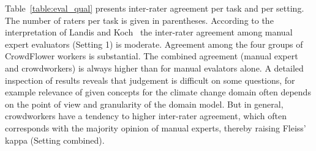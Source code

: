Table~\ref{table:eval_qual} presents inter-rater agreement per task and per setting. 
The number of raters per task is given in parentheses.
According to the interpretation of Landis and Koch~\cite{landis1977}
the inter-rater agreement among manual expert evaluators (Setting 1) is moderate. Agreement among the four groups of CrowdFlower workers is 
substantial. The combined agreement (manual expert and crowdworkers) is always higher than for manual evalators alone.
A detailed inspection of results reveals that judgement is difficult on some questions, for example 
relevance of given concepts for the climate change domain often depends on the point of view and granularity of the domain model.
But in general, crowdworkers have a tendency to higher inter-rater agreement, which often corresponds with the majority opinion of manual experts,
thereby raising Fleiss' kappa (Setting combined).
